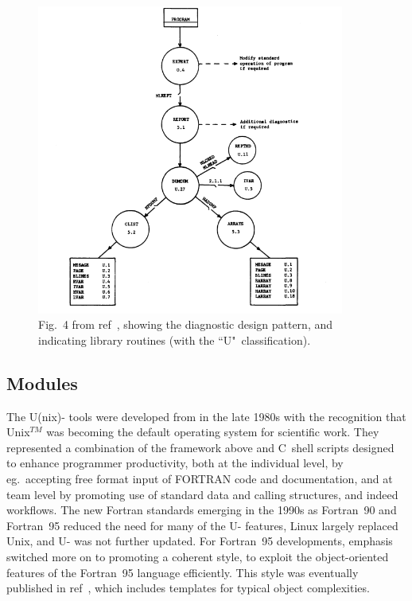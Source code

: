 \begin{figure}
\centerline{\includegraphics[width=0.9\textwidth]{../pics/olympus_diagn}}
\caption{Fig.~4 from ref~\protect\cite{Ch74Stan}, showing the
diagnostic design pattern, and indicating library routines
(with the ``U"~classification).\label{fig:olympus_diagn}}
\end{figure}

\subsection{ Modules}\label{sec:smardda}
The U(nix)- tools were developed from  in the late 1980s with the recognition that Unix$^{TM}$
was becoming the default operating system for scientific work. They represented a 
combination of the  framework above and C~shell scripts designed to enhance programmer
productivity, both at the individual level, by eg.\ 
accepting free format input of FORTRAN code and documentation, and at team level
by promoting use of standard data and calling structures, and indeed workflows.
The new Fortran standards emerging in the 1990s as Fortran~90 and Fortran~95 reduced
the need for many of the U- features, Linux largely replaced Unix, and U-\F{OLYMPUS}
was not further updated. For Fortran~95 developments, emphasis switched
more on to promoting a coherent style, to exploit the object-oriented features
of the Fortran~95 language efficiently.  This style was eventually published in ref~\cite{fprog},
which includes templates for typical object complexities.

